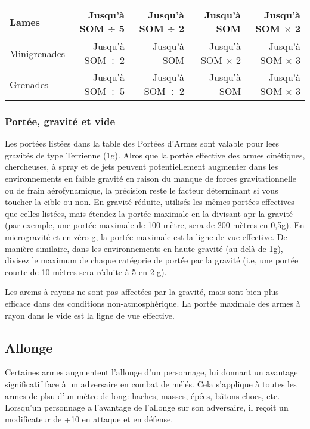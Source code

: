 \begin{table}
\begin{tabularx}{\textwidth}{|X|r|r|r|r|}
Lames &Jusqu'à SOM $\div$ 5 &Jusqu'à SOM $\div$ 2 &Jusqu'à SOM &Jusqu'à SOM $\times$ 2 \\ \hline

Minigrenades &Jusqu'à SOM $\div$ 2 &Jusqu'à SOM &Jusqu'à SOM $\times$ 2 &Jusqu'à SOM $\times$ 3 \\ \hline

Grenades &Jusqu'à SOM $\div$ 5 &Jusqu'à SOM $\div$ 2 &Jusqu'à SOM &Jusqu'à SOM $\times$ 3 \\ \hline

\end{tabularx} \end{table} 

\subsubsection{Portée, gravité et vide} 

Les portées listées dans la table des Portées d'Armes sont valable pour lees gravités de type Terrienne (1g). Alros que la portée effective des armes cinétiques, chercheuses, à spray et de jets peuvent potentiellement augmenter dans les environnements en faible gravité en raison du manque de forces gravitationnelle ou de frain aérofynamique, la précision reste le facteur déterminant si vous toucher la cible ou non. En gravité réduite, utilisés les mêmes portées effectives que celles listées, mais étendez la portée maximale en la divisant apr la gravité (par exemple, une portée maximale de 100 mètre, sera de 200 mètres en 0,5g). En microgravité et en zéro-g, la portée maximale est la ligne de vue effective. De manière similaire, dans les environnements en haute-gravité (au-delà de 1g), divisez le maximum de chaque catégorie de portée  par la gravité (i.e, une portée courte de 10 mètres sera réduite à 5 en 2 g). 

Les arems à rayons ne sont pas affectées par la gravité, mais sont bien plus efficace dans des conditions non-atmosphérique. La portée maximale des armes à rayon dans le vide est la ligne de vue effective. 

\subsection{Allonge} \label{sec:reach} 

Certaines armes augmentent l'allonge d'un personnage, lui donnant un avantage significatif face à un adversaire en combat de mélés. Cela s'applique à toutes les armes de plsu d'un mètre de long: haches, masses, épées, bâtons chocs, etc. Lorsqu'un personnage a l'avantage de l'allonge sur son adversaire, il reçoit un modificateur de +10 en attaque et en défense. 

